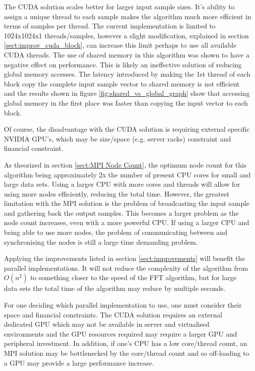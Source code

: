 \documentclass[11pt,a4paper]{article}
\begin{document}
The CUDA solution scales better for larger input sample sizes. It's ability to assign a unique thread to each sample makes the algorithm much more efficient in terms of samples per thread. The current implementation is limited to 1024x1024x1 threads/samples, however a slight modification, explained in section \ref{sect:improv_cuda_block}, can increase this limit perhaps to use all available CUDA threads. The use of shared memory in this algorithm was shown to have a negative effect on performance. This is likely an ineffective solution of reducing global memory accesses. The latency introduced by making the 1st thread of each block copy the complete input sample vector to shared memory is not efficient and the results shown in figure \ref{fig:shared_vs_global_graph} show that accessing global memory in the first place was faster than copying the input vector to each block.

Of course, the disadvantage with the CUDA solution is requiring external specific NVIDIA GPU's, which may be size/space (e.g. server racks) constraint and financial constraint. 

As theorized in section \ref{sect:MPI Node Count}, the optimum node count for this algorithm being approximately 2x the number of present CPU cores for small and large data sets. Using a larger CPU with more cores and threads will allow for using more nodes efficiently, reducing the total time. However, the greatest limitation with the MPI solution is the problem of broadcasting the input sample and gathering back the output samples. This becomes a larger problem as the node count increases, even with a more powerful CPU. If using a larger CPU and being able to use more nodes, the problem of communicating between and synchronising the nodes is still a large time demanding problem.

Applying the improvements listed in section \ref{sect:improvements} will benefit the parallel implementations. It will not reduce the complexity of the algorithm from $O(n^2)$ to something closer to the speed of the FFT algorithm, but for large data sets the total time of the algorithm may reduce by multiple seconds.

For one deciding which parallel implementation to use, one must consider their space and financial constraints. The CUDA solution requires an external dedicated GPU which may not be available in server and virtualised environments \citep{server:gpu} and the GPU resources required may require a larger GPU and peripheral investment. In addition, if one's CPU has a low core/thread count, an MPI solution may be bottlenecked by the core/thread count and so off-loading to a GPU may provide a large performance increase.

\newpage
 
\end{document}
